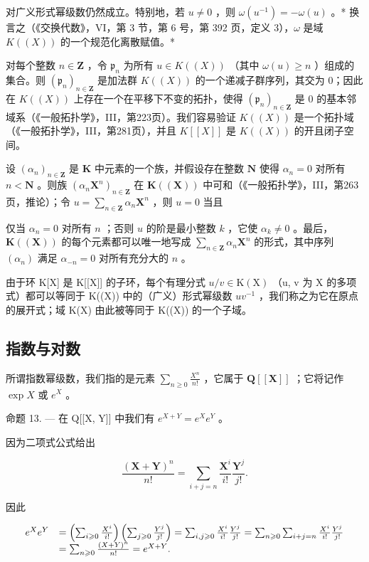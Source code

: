 对广义形式幂级数仍然成立。特别地，若 \(u \neq 0\) ，则 \(\omega(u^{-1}) = -\omega(u)\) 。* 换言之（《交换代数》，VI，第 3 节，第 6 号，第 392 页，定义 3），\(\omega\) 是域 \(K((X))\) 的一个规范化离散赋值。*

对每个整数 \(n \in \mathbf{Z}\) ，令 \(\mathfrak{p}_n\) 为所有 \(u \in K((X))\) （其中 \(\omega(u) \geqslant n\) ）组成的集合。则 \((\mathfrak{p}_n)_{n \in \mathbf{Z}}\) 是加法群 \(K((X))\) 的一个递减子群序列，其交为 0；因此在 \(K((X))\) 上存在一个在平移下不变的拓扑，使得 \((\mathfrak{p}_n)_{n \in \mathbf{Z}}\) 是 0 的基本邻域系（《一般拓扑学》，III，第223页）。我们容易验证 \(K((X))\) 是一个拓扑域（《一般拓扑学》，III，第281页），并且 \(K[[X]]\) 是 \(K((X))\) 的开且闭子空间。

设 \((\alpha_{n})_{n\in \mathbf{Z}}\) 是 \(\mathbf{K}\) 中元素的一个族，并假设存在整数 \(\mathbf{N}\) 使得 \(\alpha_{n} = 0\) 对所有 \(n < \mathbf{N}\) 。则族 \((\alpha_{n}\mathbf{X}^{n})_{n\in \mathbf{Z}}\) 在 \(\mathbf{K}((\mathbf{X}))\) 中可和（《一般拓扑学》，III，第263页，推论）；令 \(u = \sum_{n\in \mathbf{Z}}\alpha_n\mathbf{X}^n\) ，则 \(u = 0\) 当且

仅当 \(\alpha_{n} = 0\) 对所有 \(n\) ；否则 \(u\) 的阶是最小整数 \(k\) ，它使 \(\alpha_{k} \neq 0\) 。最后，\(\mathbf{K}((\mathbf{X}))\) 的每个元素都可以唯一地写成 \(\sum_{n \in \mathbf{Z}} \alpha_{n} \mathbf{X}^{n}\) 的形式，其中序列 \((\alpha_{n})\) 满足 \(\alpha_{-n} = 0\) 对所有充分大的 \(n\) 。

由于环 K{[}X{]} 是 K{[}{[}X{]}{]} 的子环，每个有理分式 \(u/v \in \mathrm{K}(\mathrm{X})\) （u, v 为 X 的多项式）都可以等同于 K((X)) 中的（广义）形式幂级数 \(uv^{-1}\) ，我们称之为它在原点的展开式；域 K(X) 由此被等同于 K((X)) 的一个子域。

\subsection{指数与对数}

所谓指数幂级数，我们指的是元素 \(\sum_{n\geqslant 0}\frac{X^n}{n!}\) ，它属于 \(\mathbf{Q}[[\mathbf{X}]]\) ；它将记作 \(\exp X\) 或 \(e^X\) 。

命题 13. --- 在 Q{[}{[}X, Y{]}{]} 中我们有 \(e^{X + Y} = e^X e^Y\) 。

因为二项式公式给出

\[
\frac {(\mathbf {X} + \mathbf {Y}) ^ {n}}{n !} = \sum_ {i + j = n} \frac {\mathbf {X} ^ {i}}{i !} \frac {\mathbf {Y} ^ {j}}{j !}.
\]

因此

\[
\begin{array}{r l} e ^ {X} e ^ {Y} & = \left(\sum_ {i \geqslant 0} \frac {X ^ {i}}{i !}\right) \left(\sum_ {j \geqslant 0} \frac {Y ^ {j}}{j !}\right) = \sum_ {i, j \geqslant 0} \frac {X ^ {i}}{i !} \frac {Y ^ {j}}{j !} = \sum_ {n \geqslant 0} \sum_ {i + j = n} \frac {X ^ {i}}{i !} \frac {Y ^ {j}}{j !} \\ & = \sum_ {n \geqslant 0} \frac {(X + Y) ^ {n}}{n !} = e ^ {X + Y}. \end{array}
\]

